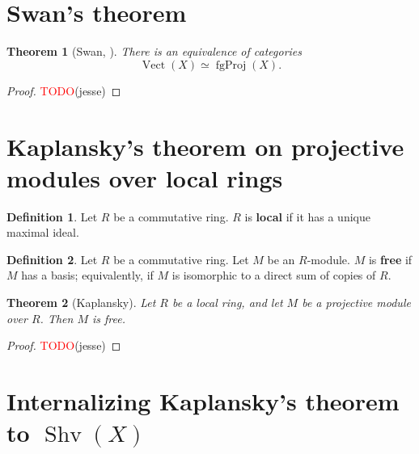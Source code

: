 \documentclass[11pt]{article}
\newcommand{\remph}[1]{\textcolor{red}{#1}}
\newcommand{\TODO}{\remph{TODO}}
\newcommand{\Vect}{\operatorname{Vect}}
\newcommand{\fgProj}{\operatorname{fgProj}}
\newcommand{\Shv}{\operatorname{Shv}}
\theoremstyle{plain}
\newtheorem{theorem}{Theorem}[section]
\theoremstyle{definition}
\newtheorem{definition}{Definition}[section]
\begin{document}
\section{Swan's theorem}

\begin{theorem}[Swan, \cite{swan1962vector}]
  There is an equivalence of categories
  \[\Vect(X) \simeq \fgProj(X).\]
\end{theorem}

\begin{proof}
  \TODO(jesse)
\end{proof}

\section{Kaplansky's theorem on projective modules over local rings}

\begin{definition}\label{def-local-ring}
  Let \(R\) be a commutative ring. \(R\) is \textbf{local} if it has a unique maximal ideal.
\end{definition}

\begin{definition}\label{def-free-module}
  Let \(R\) be a commutative ring. Let \(M\) be an \(R\)-module. \(M\) is \textbf{free} if \(M\) has a basis; equivalently, if \(M\) is isomorphic to a direct sum of copies of \(R\).
\end{definition}

\begin{theorem}[Kaplansky]\label{thm-kaplansky}
  Let \(R\) be a local ring, and let \(M\) be a projective module over \(R\). Then \(M\) is free.
\end{theorem}

\begin{proof}
  \TODO(jesse)
\end{proof}

\section{Internalizing Kaplansky's theorem to \(\Shv(X)\)}


\end{document}
